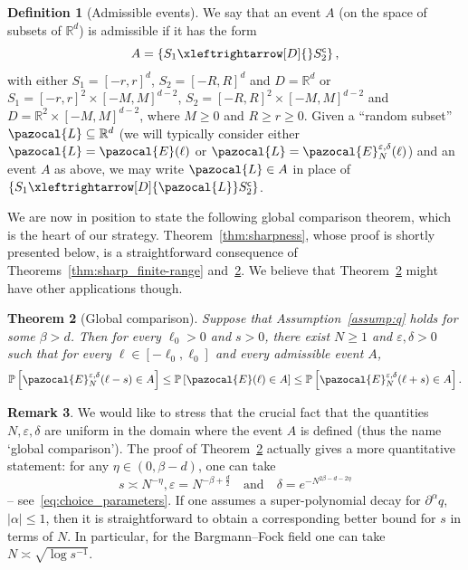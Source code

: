 \documentclass[10pt]{amsart}
\newtheorem{theo}{Theorem}[section]
\theoremstyle{definition}\newtheorem{defi}[theo]{Definition}\newtheorem{rema}[theo]{Remark}\newtheorem{exam}[theo]{Example}\newtheorem{exem}[theo]{Example}\newtheorem{nota}[theo]{Notation}
\renewcommand{\P}{\mathbb{P}}
\newcommand{\R}{\mathbb{R}}
\newcommand{\sfc}{\mathsf{c}}
\newcommand{\lr}[4]{#3\xleftrightarrow[#1]{#2} #4}
\begin{document}
\begin{defi}[Admissible events]\label{def:admissible}
We say that an event $A$ (on the space of subsets of $\R^d$) is admissible if it has the form
\[
A=\left\{\lr{D}{}{S_1}{S_2^{\sfc}}\right\},
\]
with either $S_1=[-r,r]^d$, $S_2=[-R,R]^d$ and $D=\R^d$ or $S_1=[-r,r]^2\times[-M,M]^{d-2}$, $S_2=[-R,R]^2\times[-M,M]^{d-2}$ and $D=\R^2\times [-M,M]^{d-2}$, where $M\geq0$ and $R\geq r\geq0$. Given a ``random subset'' $\pazocal{L}\subseteq\R^d$ (we will typically consider either $\pazocal{L}=\pazocal{E}(\ell)$ or $\pazocal{L}=\pazocal{E}_N^{\varepsilon,\delta}(\ell)$) and an event $A$ as above, we may write $\pazocal{L}\in A$ in place of $\{\lr{D}{\pazocal{L}}{S_1}{S_2^{\sfc}}\}$.
\end{defi}


We are now in position to state the following global comparison theorem, which is the heart of our strategy. Theorem~\ref{thm:sharpness}, whose proof is shortly presented below, is a straightforward consequence of Theorems~\ref{thm:sharp_finite-range} and~\ref{thm:comparison}. We believe that Theorem~\ref{thm:comparison} might have other applications though.


\begin{theo}[Global comparison]\label{thm:comparison}
Suppose that Assumption~\ref{assump:q} holds for some $\beta>d$. Then for every $\ell_0>0$ and $s>0$, there exist $N\geq1$ and $\varepsilon,\delta>0$ such that for every $\ell\in [-\ell_0,\ell_0]$ and every admissible event $A$,
\begin{equation}\label{eq:comparison}
\P\left[\pazocal{E}_N^{\varepsilon,\delta}(\ell-s)\in A\right]\leq \P\left[\pazocal{E}(\ell)\in A\right]\leq \P\left[\pazocal{E}_N^{\varepsilon,\delta}(\ell+s)\in A\right].
\end{equation}
\end{theo}


\begin{rema}\label{rmk:quantitative}
We would like to stress that the crucial fact that the quantities $N,\varepsilon,\delta$ are uniform in the domain where the event $A$ is defined (thus the name `global comparison'). The proof of Theorem~\ref{thm:comparison} actually gives a more quantitative statement: for any $\eta\in(0,\beta-d)$, one can take
\[
s\asymp N^{-\eta}, \varepsilon=N^{-\beta+\frac{d}{2}}\quad \text{and}\quad\delta=e^{-N^{2\beta-d-2\eta}}
\]
-- see~\eqref{eq:choice_parameters}. If one assumes a super-polynomial decay for $\partial^\alpha q$, $|\alpha|\leq1$, then it is straightforward to obtain a corresponding better bound for $s$ in terms of $N$. In particular, for the Bargmann--Fock field one can take $N\asymp \sqrt{\log s^{-1}}$.
\end{rema}
\end{document}
